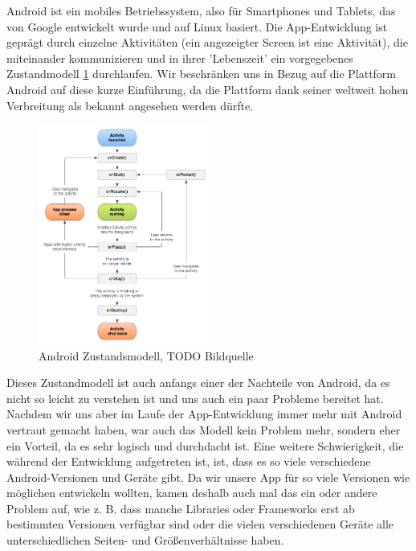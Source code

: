 Android ist ein mobiles Betriebssystem, also für Smartphones und Tablets, das von Google entwickelt wurde und auf Linux basiert. Die App-Entwicklung ist geprägt durch einzelne Aktivitäten (ein angezeigter Screen ist eine Aktivität), die miteinander kommunizieren und in ihrer 'Lebenszeit' ein vorgegebenes Zustandmodell \ref{figure:androidZustandsmodell} durchlaufen. Wir beschränken uns in Bezug auf die Plattform Android auf diese kurze Einführung, da die Plattform dank seiner weltweit hohen Verbreitung als bekannt angesehen werden dürfte.

\begin{figure}[htp]
	\centering
  	\includegraphics[width=0.5\textwidth]{img/modelle/AndroidZustandsmodell.png}
	\caption[Android Zustandsmodell]{Android Zustandsmodell, TODO Bildquelle}
	\label{figure:androidZustandsmodell}
\end{figure}

Dieses Zustandmodell ist auch anfangs einer der Nachteile von Android, da es nicht so leicht zu verstehen ist und uns auch ein paar Probleme bereitet hat. Nachdem wir uns aber im Laufe der App-Entwicklung immer mehr mit Android vertraut gemacht haben, war auch das Modell kein Problem mehr, sondern eher ein Vorteil, da es sehr logisch und durchdacht ist. Eine weitere Schwierigkeit, die während der Entwicklung aufgetreten ist, ist, dass es so viele verschiedene Android-Versionen und Geräte gibt. Da wir unsere App für so viele Versionen wie möglichen entwickeln wollten, kamen deshalb auch mal das ein oder andere Problem auf, wie z. B. dass manche Libraries oder Frameworks erst ab bestimmten Versionen verfügbar sind oder die vielen verschiedenen Geräte alle unterschiedlichen Seiten- und Größenverhältnisse haben.

